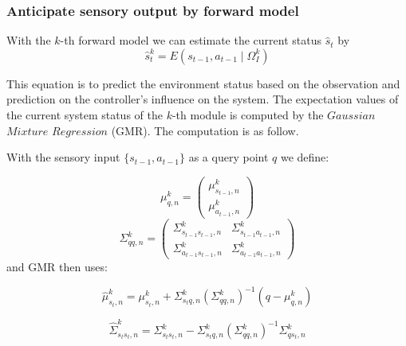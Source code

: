 \subsubsection{Anticipate sensory output by forward model}
\label{sec:forward}
With the $k$-th forward model we can estimate the current status $\hat{s}_t$ by
\begin{equation}
\label{e3}
\hat{s}^k_{t} = E\left({s_{t-1}, a_{t-1} \mid \Omega^k_I}\right)
\end{equation}

%

This equation is to predict the environment status based on the observation and prediction on the controller's influence on the system. The expectation values of the current system status of the $k$-th module is computed by the $Gaussian$ $Mixture$ $Regression$ (GMR). The computation is as follow.

With the sensory input $\{s_{t-1},a_{t-1}\}$ as a query point $q$ we define:

\begin{equation}
{
 {\mu}_{q,n}^k = \begin{pmatrix} {\mu}_{s_{t-1},n}^k    \\
                                        {\mu}_{a_{t-1},n}^k
                        \end{pmatrix}
}
\end{equation}
\begin{equation}
{
{\Sigma}_{qq,n}^k =  \begin{pmatrix} {\Sigma}_{s_{t-1}s_{t-1},n}^k  & {\Sigma}_{s_{t-1}{a_{t-1},n}}^k  \\
                                            {\Sigma}_{{a_{t-1}}{s_{t-1}},n}^k  & {\Sigma}_{{a_{t-1}}{a_{t-1}},n}^k
                            \end{pmatrix}
}
\end{equation}
and GMR then uses:

\begin{equation}
{
\hat{\mu}_{s_t,n}^k = {\mu}_{s_t,n}^k + \Sigma_{{s_t}q,n}^k({\Sigma}_{qq,n}^k)^{-1}(q-{\mu}_{q,n}^k)
}
\end{equation}

\begin{equation}
{
\hat{\Sigma}_{{s_t}{s_t},n}^k = {\Sigma}_{{s_t}{s_t},n}^k - {\Sigma}_{{s_t}q,n}^k({\Sigma}_{qq,n}^k)^{-1}{\Sigma}_{q{s_t},n}^k
}
\end{equation}


